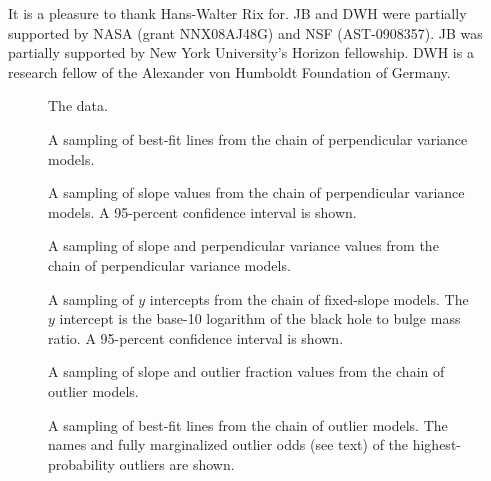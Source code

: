 \documentclass[12pt,preprint]{aastex}
\begin{document}
\acknowledgments It is a pleasure to thank Hans-Walter Rix for. JB and
DWH were partially supported by NASA (grant NNX08AJ48G) and NSF
(AST-0908357).  JB was partially supported by New York University's
Horizon fellowship.  DWH is a research fellow of the Alexander von
Humboldt Foundation of Germany.

\clearpage
\begin{figure}
\caption{The data.}
\end{figure}

\clearpage
\begin{figure}
\caption{A sampling of best-fit lines from the chain of perpendicular
  variance models.}
\end{figure}

\clearpage
\begin{figure}
\caption{A sampling of slope values from the chain of perpendicular
  variance models.  A 95-percent confidence interval is shown.}
\end{figure}

\clearpage
\begin{figure}
\caption{A sampling of slope and perpendicular variance values from
  the chain of perpendicular variance models.}
\end{figure}

\clearpage
\begin{figure}
\caption{A sampling of $y$ intercepts from the chain of fixed-slope
  models.  The $y$ intercept is the base-10 logarithm of the black
  hole to bulge mass ratio.  A 95-percent confidence interval is
  shown.}
\end{figure}

\clearpage
\begin{figure}
\caption{A sampling of slope and outlier fraction values from the
  chain of outlier models.}
\end{figure}

\clearpage
\begin{figure}
\caption{A sampling of best-fit lines from the chain of outlier
  models.  The names and fully marginalized outlier odds (see text) of
  the highest-probability outliers are shown.}
\end{figure}
\end{document}
